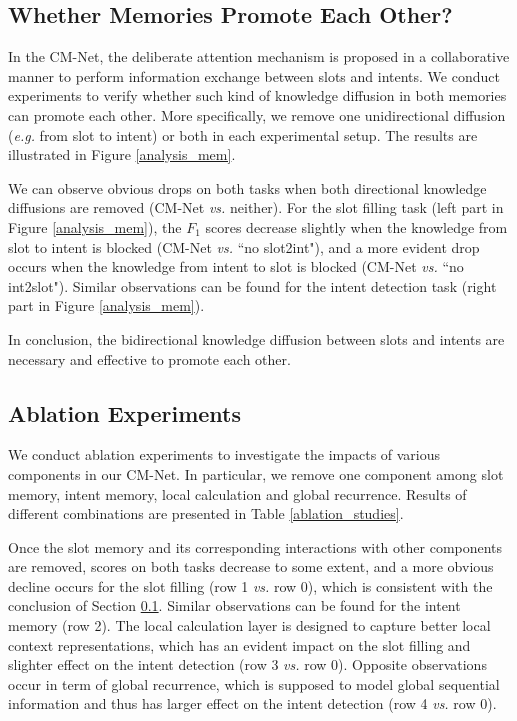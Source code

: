\documentclass[11pt,a4paper]{article}
\begin{document}
\subsection{Whether Memories Promote Each Other?}
\label{analysis_promote_each_other}
In the CM-Net, the deliberate attention mechanism is proposed in a collaborative manner to perform information exchange between slots and intents. We conduct experiments to verify whether such kind of knowledge diffusion in both memories can promote each other. 
More specifically, we remove one unidirectional diffusion ({\em e.g.} from slot to intent) or both in each experimental setup. The results are illustrated in Figure \ref{analysis_mem}.

We can observe obvious drops on both tasks when both directional knowledge diffusions are removed (CM-Net {\em vs.} neither). For the slot filling task (left part in Figure \ref{analysis_mem}), the $F_1$ scores decrease slightly when the knowledge from slot to intent is blocked (CM-Net {\em vs.} ``no slot2int"), and a more evident drop occurs when the knowledge from intent to slot is blocked (CM-Net {\em vs.} ``no int2slot"). Similar observations can be found for the intent detection task (right part in Figure \ref{analysis_mem}).

In conclusion, the bidirectional knowledge diffusion between slots and intents are necessary and effective to promote each other.

\subsection{Ablation Experiments}
\label{ablation_experiment}
We conduct ablation experiments to investigate the impacts of various components in our CM-Net. In particular, we remove one component among slot memory, intent memory, local calculation and global recurrence. Results of different combinations are presented in Table \ref{ablation_studies}. 

Once the slot memory and its corresponding interactions with other components are removed, scores on both tasks decrease to some extent, and a more obvious decline occurs for the slot filling (row 1 {\em vs.} row 0), which is consistent with the conclusion of Section \ref{analysis_promote_each_other}. Similar observations can be found for the intent memory (row 2). The local calculation layer is designed to capture better local context representations, which has an evident impact on the slot filling and slighter effect on the intent detection (row 3 {\em vs.} row 0). Opposite observations occur in term of global recurrence, which is supposed to model global sequential information and thus has larger effect on the intent detection (row 4 {\em vs.} row 0).
\end{document}
